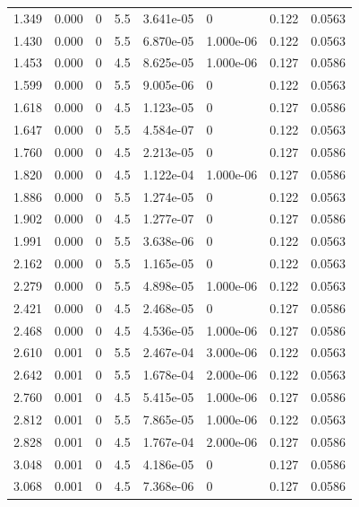 \documentclass[preview]{standalone}
\begin{document}
{{\begin{tabular}{L{1.2cm}C{1.2cm} C{0.3cm}C{0.5cm} C{1.4cm}C{1.4cm} C{1.4cm}C{1.4cm}}
  1.349  &  0.000  & 0     & 5.5 &  3.641e-05  & 0  & 0.122 &  0.0563   \\ 
  1.430  &  0.000  & 0     & 5.5 &  6.870e-05  & 1.000e-06  & 0.122 &  0.0563   \\ 
  1.453  &  0.000  & 0     & 4.5 &  8.625e-05  & 1.000e-06  & 0.127 &  0.0586   \\ 
  1.599  &  0.000  & 0     & 5.5 &  9.005e-06  & 0  & 0.122 &  0.0563   \\ 
  1.618  &  0.000  & 0     & 4.5 &  1.123e-05  & 0  & 0.127 &  0.0586   \\ 
  1.647  &  0.000  & 0     & 5.5 &  4.584e-07  & 0  & 0.122 &  0.0563   \\ 
  1.760  &  0.000  & 0     & 4.5 &  2.213e-05  & 0  & 0.127 &  0.0586   \\ 
  1.820  &  0.000  & 0     & 4.5 &  1.122e-04  & 1.000e-06  & 0.127 &  0.0586   \\ 
  1.886  &  0.000  & 0     & 5.5 &  1.274e-05  & 0  & 0.122 &  0.0563   \\ 
  1.902  &  0.000  & 0     & 4.5 &  1.277e-07  & 0  & 0.127 &  0.0586   \\ 
  1.991  &  0.000  & 0     & 5.5 &  3.638e-06  & 0  & 0.122 &  0.0563   \\ 
  2.162  &  0.000  & 0     & 5.5 &  1.165e-05  & 0  & 0.122 &  0.0563   \\ 
  2.279  &  0.000  & 0     & 5.5 &  4.898e-05  & 1.000e-06  & 0.122 &  0.0563   \\ 
  2.421  &  0.000  & 0     & 4.5 &  2.468e-05  & 0  & 0.127 &  0.0586   \\ 
  2.468  &  0.000  & 0     & 4.5 &  4.536e-05  & 1.000e-06  & 0.127 &  0.0586   \\ 
  2.610  &  0.001  & 0     & 5.5 &  2.467e-04  & 3.000e-06  & 0.122 &  0.0563   \\ 
  2.642  &  0.001  & 0     & 5.5 &  1.678e-04  & 2.000e-06  & 0.122 &  0.0563   \\ 
  2.760  &  0.001  & 0     & 4.5 &  5.415e-05  & 1.000e-06  & 0.127 &  0.0586   \\ 
  2.812  &  0.001  & 0     & 5.5 &  7.865e-05  & 1.000e-06  & 0.122 &  0.0563   \\ 
  2.828  &  0.001  & 0     & 4.5 &  1.767e-04  & 2.000e-06  & 0.127 &  0.0586   \\ 
  3.048  &  0.001  & 0     & 4.5 &  4.186e-05  & 0  & 0.127 &  0.0586   \\ 
  3.068  &  0.001  & 0     & 4.5 &  7.368e-06  & 0  & 0.127 &  0.0586   \\ 

\end{tabular}}}
\end{document}

